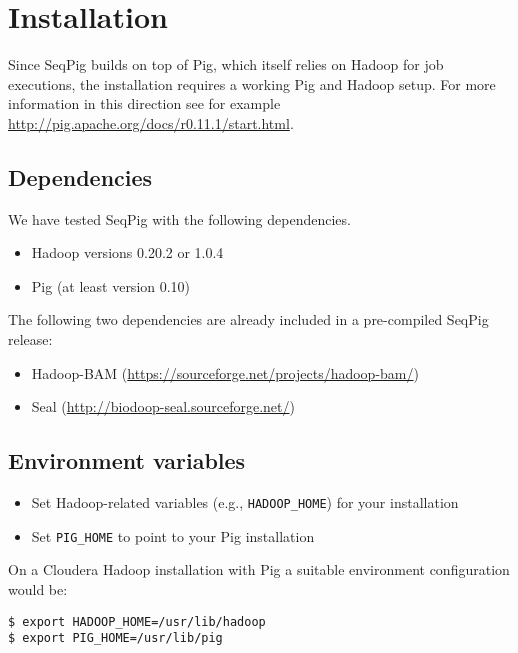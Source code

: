 
\section{Installation}



Since SeqPig builds on top of Pig, which itself relies on Hadoop for
job executions, the installation requires a working Pig and Hadoop
setup. For more information in this direction see for example \url{http://pig.apache.org/docs/r0.11.1/start.html}.

\subsection{Dependencies}
%
We have tested SeqPig with the following dependencies.
%
\begin{itemize}
	\item Hadoop versions 0.20.2 or 1.0.4
	\item Pig (at least version 0.10)
\end{itemize}
%
The following two dependencies are already included in a pre-compiled SeqPig release:
\begin{itemize}
\item Hadoop-BAM (\url{https://sourceforge.net/projects/hadoop-bam/})
\item Seal (\url{http://biodoop-seal.sourceforge.net/})
\end{itemize}

\subsection{Environment variables}
\label{sect:install_env}
\begin{itemize}
\item Set Hadoop-related variables (e.g., {\tt HADOOP\_HOME}) for your
	installation
\item Set {\tt PIG\_HOME} to point to your Pig installation
\end{itemize}

On a Cloudera Hadoop installation with Pig a suitable environment configuration would be:
\begin{lstlisting} 
$ export HADOOP_HOME=/usr/lib/hadoop
$ export PIG_HOME=/usr/lib/pig
\end{lstlisting}

